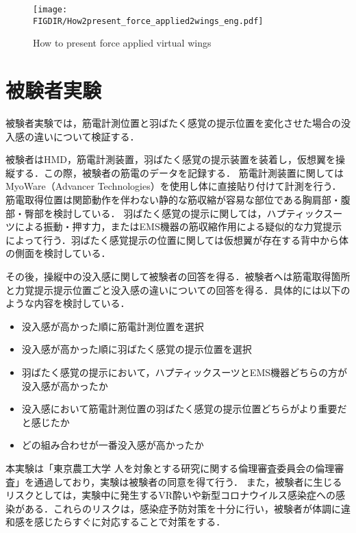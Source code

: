 \begin{small}
    \begin{figure}[t]
      \begin{center}
        \texttt{[image: \\FIGDIR/How2present\_force\_applied2wings\_eng.pdf]}%
        \caption{How to present force applied virtual wings}
      \end{center}
    \end{figure}



\section{被験者実験}
  被験者実験では，筋電計測位置と羽ばたく感覚の提示位置を変化させた場合の没入感の違いについて検証する．
    
  被験者はHMD，筋電計測装置，羽ばたく感覚の提示装置を装着し，仮想翼を操縦する．この際，被験者の筋電のデータを記録する．
  筋電計測装置に関してはMyoWare（Advancer Technologies）を使用し体に直接貼り付けて計測を行う．筋電取得位置は関節動作を伴わない静的な筋収縮が容易な部位である胸肩部・腹部・臀部を検討している．
  羽ばたく感覚の提示に関しては，ハプティックスーツによる振動・押す力，またはEMS機器の筋収縮作用による疑似的な力覚提示によって行う．羽ばたく感覚提示の位置に関しては仮想翼が存在する背中から体の側面を検討している．
  
  その後，操縦中の没入感に関して被験者の回答を得る．被験者へは筋電取得箇所と力覚提示提示位置ごと没入感の違いについての回答を得る．具体的には以下のような内容を検討している．
  \begin{itemize}
    \item 没入感が高かった順に筋電計測位置を選択 %
    \item 没入感が高かった順に羽ばたく感覚の提示位置を選択
    \item 羽ばたく感覚の提示において，ハプティックスーツとEMS機器どちらの方が没入感が高かったか
    \item 没入感において筋電計測位置の羽ばたく感覚の提示位置どちらがより重要だと感じたか
    \item どの組み合わせが一番没入感が高かったか
  \end{itemize}
    

  本実験は「東京農工大学 人を対象とする研究に関する倫理審査委員会の倫理審査」を通過しており，実験は被験者の同意を得て行う．
  また，被験者に生じるリスクとしては，実験中に発生するVR酔いや新型コロナウイルス感染症への感染がある．これらのリスクは，感染症予防対策を十分に行い，被験者が体調に違和感を感じたらすぐに対応することで対策をする．
  

\end{small}
